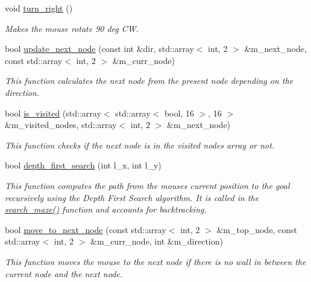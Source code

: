 \begin{DoxyCompactItemize}
void \hyperlink{classrwa2_1_1_mouse_ac929127d86fc4a41d1e216968b1dae20}{turn\+\_\+right} ()
\begin{DoxyCompactList}\small\item\em Makes the mouse rotate 90 deg CW. \end{DoxyCompactList}\item 
bool \hyperlink{classrwa2_1_1_mouse_a63207988e700b8d4c2ed6485acc0f784}{update\+\_\+next\+\_\+node} (const int \&dir, std\+::array$<$ int, 2 $>$ \&m\+\_\+next\+\_\+node, const std\+::array$<$ int, 2 $>$ \&m\+\_\+curr\+\_\+node)
\begin{DoxyCompactList}\small\item\em This function calculates the next node from the present node depending on the direction. \end{DoxyCompactList}\item 
bool \hyperlink{classrwa2_1_1_mouse_affc9c085e88aa2dbf07df41bc0596473}{is\+\_\+visited} (std\+::array$<$ std\+::array$<$ bool, 16 $>$, 16 $>$ \&m\+\_\+visited\+\_\+nodes, std\+::array$<$ int, 2 $>$ \&m\+\_\+next\+\_\+node)
\begin{DoxyCompactList}\small\item\em This function checks if the next node is in the visited nodes array or not. \end{DoxyCompactList}\item 
bool \hyperlink{classrwa2_1_1_mouse_a2f92de0dcd37dd4c47cc4bbda15dd81d}{depth\+\_\+first\+\_\+search} (int l\+\_\+x, int l\+\_\+y)
\begin{DoxyCompactList}\small\item\em This function computes the path from the mouse\textquotesingle{}s current position to the goal recursively using the Depth First Search algorithm. It is called in the \hyperlink{classrwa2_1_1_mouse_a789be287a432bafc903c97396a014d7d}{search\+\_\+maze()} function and accounts for backtracking. \end{DoxyCompactList}\item 
bool \hyperlink{classrwa2_1_1_mouse_ab560dba145a772d07698a7b53de2a70b}{move\+\_\+to\+\_\+next\+\_\+node} (const std\+::array$<$ int, 2 $>$ \&m\+\_\+top\+\_\+node, const std\+::array$<$ int, 2 $>$ \&m\+\_\+curr\+\_\+node, int \&m\+\_\+direction)
\begin{DoxyCompactList}\small\item\em This function moves the mouse to the next node if there is no wall in between the current node and the next node. \end{DoxyCompactList}\end{DoxyCompactItemize}


